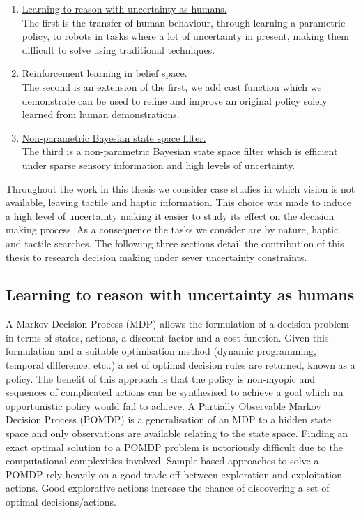 \begin{enumerate}
 \item[\ref{sub:contr1}] \hyperref[sub:contr1]{Learning to reason with uncertainty as humans.}\\
 The first is the transfer of human behaviour, through learning a parametric policy, to robots in tasks where 
 a lot of uncertainty in present, making them difficult to solve using traditional techniques.
 \item[\ref{sub:contr2}] \hyperref[sub:contr2]{Reinforcement learning in belief space.}\\
 The second is an extension of the first, we add cost function which we demonstrate can be used 
 to refine and improve an original policy solely learned from human demonstrations.
 \item[\ref{sub:contr3}] \hyperref[sub:contr3]{Non-parametric Bayesian state space filter.}\\
 The third is a non-parametric Bayesian state space filter which is efficient under sparse sensory information 
and high levels of uncertainty.

\end{enumerate}


Throughout the work in this thesis we consider case studies in which vision is not available, leaving tactile and 
haptic information. This choice was made to induce a high level of uncertainty making it easier to study its effect 
on the decision making process. As a consequence the tasks we consider are by nature, haptic and tactile searches.
The following three sections detail the contribution of this thesis to research decision making under sever 
uncertainty constraints.

\subsection{Learning to reason with uncertainty as humans}\label{sub:contr1}

A Markov Decision Process (MDP) allows the formulation of a decision problem in terms of states, actions, a discount factor 
and a cost function. Given this formulation and a suitable optimisation method (dynamic programming, temporal difference, etc..) 
a set of optimal decision rules are returned, known as a policy. The benefit of this approach 
is that the policy is non-myopic and sequences of complicated actions can be synthesised to achieve a goal which 
an opportunistic policy would fail to achieve. A Partially Observable Markov Decision Process (POMDP) is 
a generalisation of an MDP to a hidden state space and only observations are available relating 
to the state space. Finding an exact optimal solution to a POMDP problem is notoriously difficult due to 
the computational complexities involved. Sample based approaches to solve a POMDP rely heavily on 
a good trade-off between exploration and exploitation actions. Good explorative actions increase the chance of discovering 
a set of optimal decisions/actions.

